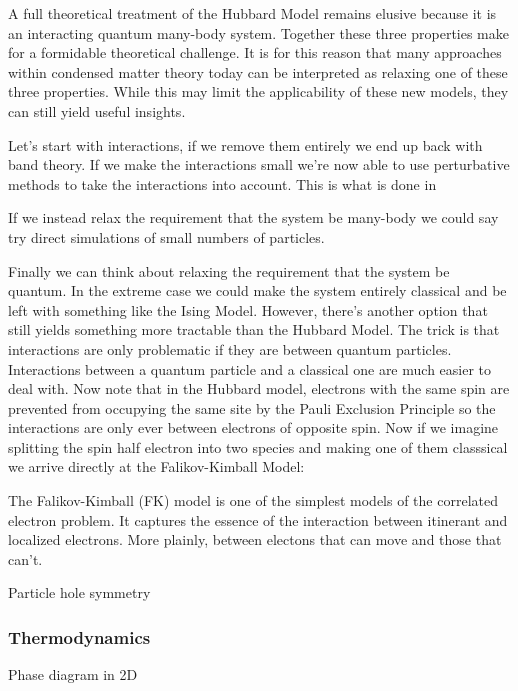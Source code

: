 A full theoretical treatment of the Hubbard Model remains elusive because it is an interacting quantum many-body system. Together these three properties make for a formidable theoretical challenge. It is for this reason that many approaches within condensed matter theory today can be interpreted as relaxing one of these three properties. While this may limit the applicability of these new models, they can still yield useful insights.

Let's start with interactions, if we remove them entirely we end up back with band theory. If we make the interactions small we're now able to use perturbative methods to take the interactions into account. This is what is done in 

If we instead relax the requirement that the system be many-body we could say try direct simulations of small numbers of particles. 

Finally we can think about relaxing the requirement that the system be quantum. In the extreme case we could make the system entirely classical and be left with something like the Ising Model. However, there's another option that still yields something more tractable than the Hubbard Model. The trick is that interactions are only problematic if they are between quantum particles. Interactions between a quantum particle and a classical one are much easier to deal with. Now note that in the Hubbard model, electrons with the same spin are prevented from occupying the same site by the Pauli Exclusion Principle so the interactions are only ever between electrons of opposite spin. Now if we imagine splitting the spin half electron into two species and making one of them classsical we arrive directly at the Falikov-Kimball Model: 




The Falikov-Kimball (FK) model is one of the simplest models of the correlated electron problem. It captures the essence of the interaction between itinerant and localized electrons. More plainly, between electons that can move and those that can't.








            Particle hole symmetry
            
\subsubsection{Thermodynamics}
    Phase diagram in 2D 
    
